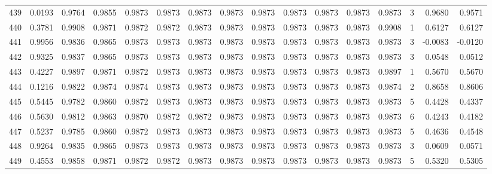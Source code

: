 \begin{tabular}{lrrrrrrrrrrrrrrr}
439 &      0.0193 &  0.9764 &  0.9855 &  0.9873 &  0.9873 &  0.9873 &  0.9873 &  0.9873 &  0.9873 &  0.9873 &   0.9873 &     0.9873 &      3 &                    0.9680 &                     0.9571 \\
440 &      0.3781 &  0.9908 &  0.9871 &  0.9872 &  0.9872 &  0.9873 &  0.9873 &  0.9873 &  0.9873 &  0.9873 &   0.9873 &     0.9908 &      1 &                    0.6127 &                     0.6127 \\
441 &      0.9956 &  0.9836 &  0.9865 &  0.9873 &  0.9873 &  0.9873 &  0.9873 &  0.9873 &  0.9873 &  0.9873 &   0.9873 &     0.9873 &      3 &                   -0.0083 &                    -0.0120 \\
442 &      0.9325 &  0.9837 &  0.9865 &  0.9873 &  0.9873 &  0.9873 &  0.9873 &  0.9873 &  0.9873 &  0.9873 &   0.9873 &     0.9873 &      3 &                    0.0548 &                     0.0512 \\
443 &      0.4227 &  0.9897 &  0.9871 &  0.9872 &  0.9873 &  0.9873 &  0.9873 &  0.9873 &  0.9873 &  0.9873 &   0.9873 &     0.9897 &      1 &                    0.5670 &                     0.5670 \\
444 &      0.1216 &  0.9822 &  0.9874 &  0.9874 &  0.9873 &  0.9873 &  0.9873 &  0.9873 &  0.9873 &  0.9873 &   0.9873 &     0.9874 &      2 &                    0.8658 &                     0.8606 \\
445 &      0.5445 &  0.9782 &  0.9860 &  0.9872 &  0.9873 &  0.9873 &  0.9873 &  0.9873 &  0.9873 &  0.9873 &   0.9873 &     0.9873 &      5 &                    0.4428 &                     0.4337 \\
446 &      0.5630 &  0.9812 &  0.9863 &  0.9870 &  0.9872 &  0.9872 &  0.9873 &  0.9873 &  0.9873 &  0.9873 &   0.9873 &     0.9873 &      6 &                    0.4243 &                     0.4182 \\
447 &      0.5237 &  0.9785 &  0.9860 &  0.9872 &  0.9873 &  0.9873 &  0.9873 &  0.9873 &  0.9873 &  0.9873 &   0.9873 &     0.9873 &      5 &                    0.4636 &                     0.4548 \\
448 &      0.9264 &  0.9835 &  0.9865 &  0.9873 &  0.9873 &  0.9873 &  0.9873 &  0.9873 &  0.9873 &  0.9873 &   0.9873 &     0.9873 &      3 &                    0.0609 &                     0.0571 \\
449 &      0.4553 &  0.9858 &  0.9871 &  0.9872 &  0.9872 &  0.9873 &  0.9873 &  0.9873 &  0.9873 &  0.9873 &   0.9873 &     0.9873 &      5 &                    0.5320 &                     0.5305 \\

\end{tabular}
